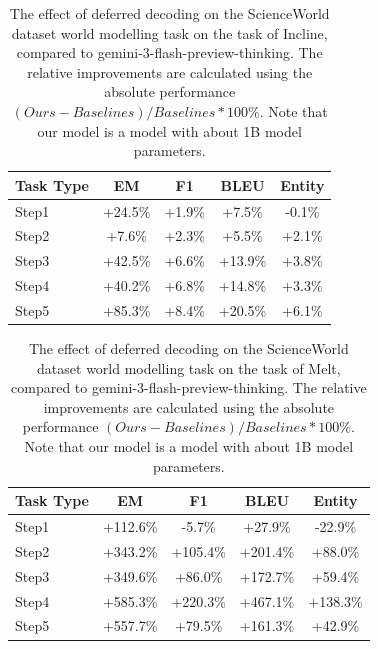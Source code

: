 \begin{table}[h]
\centering
    \setlength\tabcolsep{15pt}
    \setlength\extrarowheight{0pt}
\caption{The effect of deferred decoding on the ScienceWorld dataset \citep{wang-etal-2022-scienceworld} world modelling task on the task of Incline, compared to gemini-3-flash-preview-thinking. The relative improvements are calculated using the absolute performance $(Ours - Baselines) / Baselines * 100\%$. Note that our model is a model with about 1B model parameters.}
\label{tab:scienceworld9}
\begin{tabular}{lcccc}
\toprule
\textbf{Task Type} & \textbf{EM} & \textbf{F1}
  & \textbf{BLEU} & \textbf{Entity}\\
\midrule
Step1 & +24.5\% & +1.9\% & +7.5\% & -0.1\% \\
Step2 & +7.6\% & +2.3\% & +5.5\% & +2.1\% \\
Step3 & +42.5\% & +6.6\% & +13.9\% & +3.8\% \\
Step4 & +40.2\% & +6.8\% & +14.8\% & +3.3\% \\
Step5 & +85.3\% & +8.4\% & +20.5\% & +6.1\% \\




\bottomrule
\end{tabular}
\end{table}




\begin{table}[h]
\centering
    \setlength\tabcolsep{15pt}
    \setlength\extrarowheight{0pt}
\caption{The effect of deferred decoding on the ScienceWorld dataset \citep{wang-etal-2022-scienceworld} world modelling task on the task of Melt, compared to gemini-3-flash-preview-thinking. The relative improvements are calculated using the absolute performance $(Ours - Baselines) / Baselines * 100\%$. Note that our model is a model with about 1B model parameters.}
\label{tab:scienceworld10}
\begin{tabular}{lcccc}
\toprule
\textbf{Task Type} & \textbf{EM} & \textbf{F1}
  & \textbf{BLEU} & \textbf{Entity}\\
\midrule
Step1 & +112.6\% & -5.7\% & +27.9\% & -22.9\% \\
Step2 & +343.2\% & +105.4\% & +201.4\% & +88.0\% \\
Step3 & +349.6\% & +86.0\% & +172.7\% & +59.4\% \\
Step4 & +585.3\% & +220.3\% & +467.1\% & +138.3\% \\
Step5 & +557.7\% & +79.5\% & +161.3\% & +42.9\% \\





\bottomrule
\end{tabular}
\end{table}



